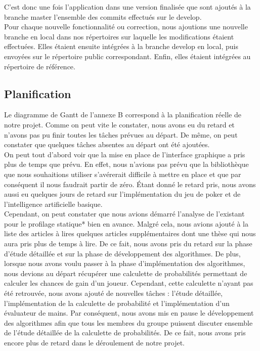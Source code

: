 \documentclass{report}
\begin{document}
C'est donc une fois l'application dans une version finalisée que sont ajoutés à la branche master l'ensemble des commits effectués sur le develop.\\

Pour chaque nouvelle fonctionnalité ou correction, nous ajoutions une nouvelle branche en local dans nos répertoires sur laquelle les modifications étaient effectuées. Elles étaient ensuite intégrées à la branche develop en local, puis envoyées sur le répertoire public correspondant. Enfin, elles étaient intégrées au répertoire de référence.\par

\subsection{Planification}
\hspace{0.5cm}Le diagramme de Gantt de l'annexe B correspond à la planification réelle de notre projet. Comme on peut vite le constater, nous avons eu du retard et n'avons pas pu finir toutes les tâches prévues au départ. De même, on peut constater que quelques tâches absentes au départ ont été ajoutées.\\

On peut tout d'abord voir que la mise en place de l'interface graphique a pris plus de temps que prévu. En effet, nous n'avions pas prévu que la bibliothèque que nous souhaitions utiliser s’avérerait difficile à mettre en place et que par conséquent il nous faudrait partir de zéro. Étant donné le retard pris, nous avons aussi eu quelques jours de retard sur l'implémentation du jeu de poker et de l'intelligence artificielle basique. \\

Cependant, on peut constater que nous avions démarré l'analyse de l'existant pour le profilage statique* bien en avance. Malgré cela, nous avions ajouté à la liste des articles à lires quelques articles supplémentaires dont une thèse qui nous aura pris plus de temps à lire. De ce fait, nous avons pris du retard sur la phase d'étude détaillée et sur la phase de développement des algorithmes. De plus, lorsque nous avons voulu passer à la phase d'implémentation des algorithmes, nous devions au départ récupérer une calculette de probabilités permettant de calculer les chances de gain d'un joueur. Cependant, cette calculette n'ayant pas été retrouvée, nous avons ajouté de nouvelles tâches : l'étude détaillée, l'implémentation de la calculette de probabilité et l'implémentation d'un évaluateur de mains. Par conséquent, nous avons mis en pause le développement des algorithmes afin que tous les membres du groupe puissent discuter ensemble de l'étude détaillée de la calculette de probabilités. De ce fait, nous avons pris encore plus de retard dans le déroulement de notre projet. \\
\end{document}
